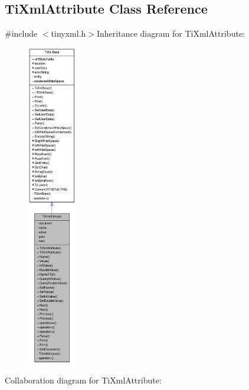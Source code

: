 \hypertarget{class_ti_xml_attribute}{
\subsection{TiXmlAttribute Class Reference}
\label{class_ti_xml_attribute}
}


{\ttfamily \#include $<$tinyxml.h$>$}Inheritance diagram for TiXmlAttribute:\nopagebreak
\begin{figure}[H]
\begin{center}
\leavevmode
\includegraphics[height=400pt]{class_ti_xml_attribute__inherit__graph}
\end{center}
\end{figure}
Collaboration diagram for TiXmlAttribute:\nopagebreak
